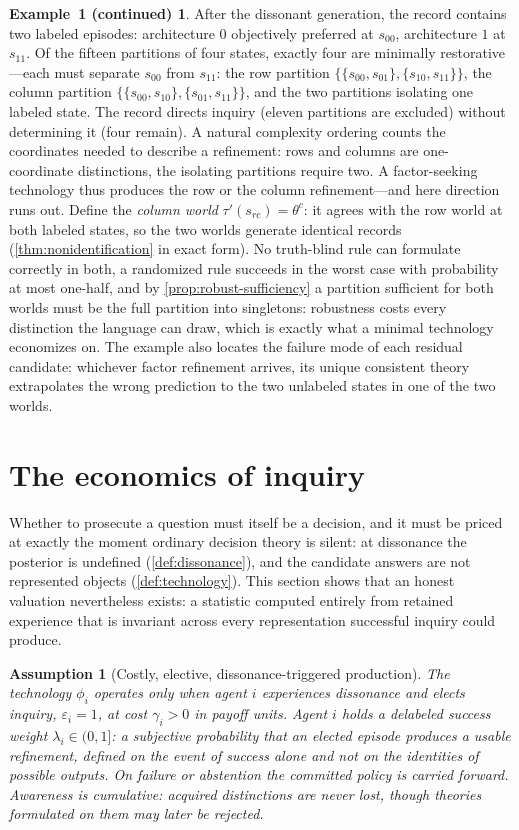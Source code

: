 \documentclass[11pt]{article}
\newtheorem{assumption}{Assumption}[section]
\theoremstyle{definition}
\newtheorem*{excont}{Example~1 (continued)}
\begin{document}
\begin{excont}
After the dissonant generation, the record contains two labeled episodes:
architecture $0$ objectively preferred at $s_{00}$, architecture $1$ at
$s_{11}$.  Of the fifteen partitions of four states, exactly four are
minimally restorative---each must separate $s_{00}$ from $s_{11}$: the row
partition $\{\{s_{00},s_{01}\},\{s_{10},s_{11}\}\}$, the column partition
$\{\{s_{00},s_{10}\},\{s_{01},s_{11}\}\}$, and the two partitions isolating
one labeled state.  The record directs inquiry (eleven partitions are
excluded) without determining it (four remain).  A natural complexity
ordering counts the coordinates needed to describe a refinement: rows and
columns are one-coordinate distinctions, the isolating partitions require
two.  A factor-seeking technology thus produces the row or the column
refinement---and here direction runs out.  Define the \emph{column world}
$\tau'(s_{rc})=\theta^{c}$: it agrees with the row world at both labeled
states, so the two worlds generate identical records
(\cref{thm:nonidentification} in exact form).  No truth-blind rule can
formulate correctly in both, a randomized rule succeeds in the worst case
with probability at most one-half, and by \cref{prop:robust-sufficiency} a
partition sufficient for both worlds must be the full partition into
singletons: robustness costs every distinction the language can draw, which
is exactly what a minimal technology economizes on.  The example also
locates the failure mode of each residual candidate: whichever factor
refinement arrives, its unique consistent theory extrapolates the wrong
prediction to the two unlabeled states in one of the two worlds.
\end{excont}
\section{The economics of inquiry}
\label{sec:economics}

Whether to prosecute a question must itself be a decision, and it must be
priced at exactly the moment ordinary decision theory is silent: at
dissonance the posterior is undefined (\cref{def:dissonance}), and the
candidate answers are not represented objects (\cref{def:technology}).  This
section shows that an honest valuation nevertheless exists: a statistic
computed entirely from retained experience that is invariant across every
representation successful inquiry could produce.

\begin{assumption}[Costly, elective, dissonance-triggered production]
\label{ass:elective}
The technology $\phi_i$ operates only when agent $i$ experiences dissonance
and elects inquiry, $\varepsilon_i=1$, at cost $\gamma_i>0$ in payoff units.
Agent $i$ holds a delabeled success weight $\lambda_i\in(0,1]$: a subjective
probability that an elected episode produces a usable refinement, defined on
the event of success alone and not on the identities of possible outputs.
On failure or abstention the committed policy is carried forward.  Awareness
is cumulative: acquired distinctions are never lost, though theories
formulated on them may later be rejected.
\end{assumption}
\end{document}
